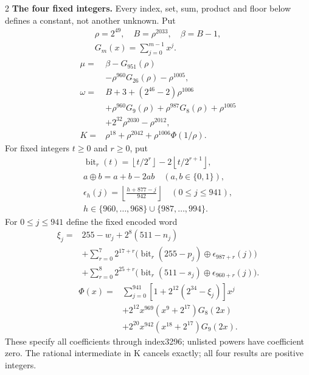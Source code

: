 \documentclass[10pt]{article}
\newcommand{\fl}[1]{\left\lfloor#1\right\rfloor}
\newcommand{\rg}[2]{\{#1,\ldots,#2\}}
\begin{document}
\begin{multicols}{2}
\textbf{The four fixed integers.}
Every index, set, sum, product and floor below defines a constant, not
another unknown. Put
\[
\begin{gathered}
\rho=2^{49},\quad B=\rho^{2033},\quad\beta=B-1,\\
G_m(x)=\sum_{j=0}^{m-1}x^j.
\end{gathered}
\]
\begin{align*}
\mu={}&\beta-G_{951}(\rho)\\
&-\rho^{960}G_{26}(\rho)-\rho^{1005},\\
\omega={}&B+3+(2^{46}-2)\rho^{1006}\\
&+\rho^{960}G_9(\rho)+\rho^{987}G_8(\rho)
  +\rho^{1005}\\
&+2^{32}\rho^{2030}-\rho^{2012},\\
K={}&\rho^{18}+\rho^{2042}+\rho^{1006}\Phi(1/\rho).
\end{align*}
For fixed integers $t\ge0$ and $r\ge0$, put
\[
\begin{gathered}
\operatorname{bit}_r(t)=\fl{t/2^r}-2\fl{t/2^{r+1}},\\
a\mathbin\oplus b=a+b-2ab\quad(a,b\in\{0,1\}),\\
\epsilon_h(j)=\fl{\frac{h+877-j}{942}}\quad(0\le j\le941),\\
h\in\rg{960}{968}\cup\rg{987}{994}.
\end{gathered}
\]
For $0\le j\le941$ define the fixed encoded word
\[
\begin{split}
\xi_j={}&255-w_j+2^8(511-n_j)\\
&+\sum_{r=0}^{7}2^{17+r}\bigl(\operatorname{bit}_r(255-p_j)
 \mathbin\oplus\epsilon_{987+r}(j)\bigr)\\
&+\sum_{r=0}^{8}2^{25+r}\bigl(\operatorname{bit}_r(511-s_j)
 \mathbin\oplus\epsilon_{960+r}(j)\bigr).
\end{split}
\]
\[
\begin{split}
\Phi(x)={}&\sum_{j=0}^{941}[1+2^{12}(2^{34}-\xi_j)]x^j\\
&+2^{12}x^{969}(x^9+2^{17})G_8(2x)\\
&+2^{20}x^{942}(x^{18}+2^{17})G_9(2x).
\end{split}
\]
These specify all coefficients through index3296; unlisted powers have
coefficient zero. The rational intermediate in K cancels exactly;
all four results are positive integers.


\end{multicols}
\end{document}
